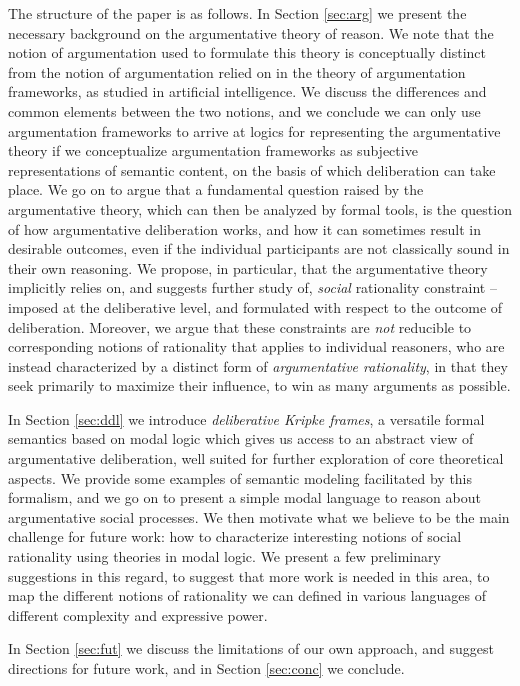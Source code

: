 \documentclass[greybox]{svmult}
\begin{document}
The structure of the paper is as follows. In Section \ref{sec:arg} we present the necessary background on the argumentative theory of reason. We note that the notion of argumentation used to formulate this theory is conceptually distinct from the notion of argumentation relied on in the theory of argumentation frameworks, as studied in artificial intelligence. We discuss the differences and common elements between the two notions,  and we conclude we can only use argumentation frameworks to arrive at logics for representing the argumentative theory if we conceptualize argumentation frameworks as subjective representations of semantic content, on the basis of which deliberation can take place. We go on to argue that a fundamental question raised by the argumentative theory, which can then be analyzed by formal tools, is the question of how argumentative deliberation works, and how it can sometimes result in desirable outcomes, even if the individual participants are not classically sound in their own reasoning. We propose, in particular, that the argumentative theory implicitly relies on, and suggests further study of, \emph{social} rationality constraint -- imposed at the deliberative level, and formulated with respect to the outcome of deliberation. Moreover, we argue that these constraints are \emph{not} reducible to corresponding notions of rationality that applies to individual reasoners, who are instead characterized by a distinct form of \emph{argumentative rationality}, in that they seek primarily to maximize their influence, to win as many arguments as possible.

In Section \ref{sec:ddl} we introduce \emph{deliberative Kripke frames}, a versatile formal semantics based on modal logic which gives us access to an abstract view of argumentative deliberation, well suited for further exploration of core theoretical aspects. We provide some examples of semantic modeling facilitated by this formalism, and we go on to present a simple modal language to reason about argumentative social processes.
We then motivate what we believe to be the main challenge for future work: how to characterize interesting notions of social rationality using theories in modal logic. We present a few preliminary suggestions in this regard, to suggest that more work is needed in this area, to map the different notions of rationality we can defined in various languages of different complexity and expressive power.  

In Section \ref{sec:fut} we discuss the limitations of our own approach, and suggest directions for future work, and in Section \ref{sec:conc} we conclude. %
\end{document}
